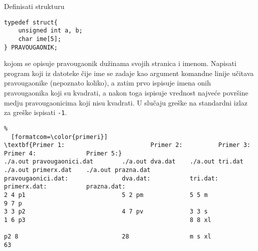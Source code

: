 \documentclass{article}
\begin{document}
\begin{z}
Definisati strukturu 
\begin{verbatim}
typedef struct{
    unsigned int a, b;
    char ime[5];
} PRAVOUGAONIK;
\end{verbatim}
kojom se opisuje pravougaonik du\v zinama svojih stranica i imenom. Napisati program koji iz datoteke \v cije ime se zadaje kao argument komandne linije u\v citava pravougaonike (nepoznato koliko), a zatim prvo ispisuje imena onih pravougaonika koji su kvadrati, a nakon toga ispisuje vrednost najve\' ce povr\v sine medju pravougaonicima koji nisu kvadrati. 
U slučaju greške na standardni izlaz za greške ispisati {\tt -1}. 
\begin{center}
\begin{Verbatim}%
  [formatcom=\color{primeri}]
\textbf{Primer 1:                        Primer 2:          Primer 3:           Primer 4:              Primer 5:}
./a.out pravougaonici.dat        ./a.out dva.dat    ./a.out tri.dat     ./a.out primerx.dat    ./a.out prazna.dat
pravougaonici.dat:               dva.dat:           tri.dat:            primerx.dat:           prazna.dat:
2 4 p1                           5 2 pm             5 5 m               9 7 p
3 3 p2                           4 7 pv             3 3 s
1 6 p3                                              8 8 xl

p2 8                             28                 m s xl              63         
\end{Verbatim}
\end{center}
\end{z}
\end{document}
